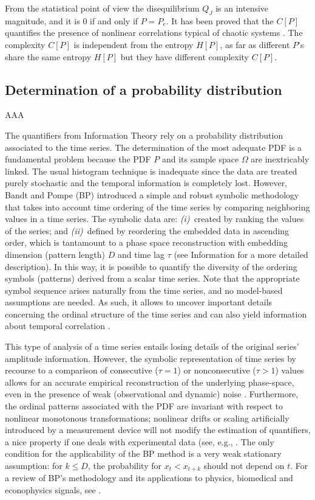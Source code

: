 From the statistical point of view the disequilibrium $Q_J$ is an intensive magnitude, and it is $0$ if and only if $P=P_e$.
It has been proved that the $C[P]$ quantifies the presence of nonlinear correlations typical of chaotic systems \cite{Martin2003,Lamberti2004}.
The complexity $C[P]$ is independent from the entropy $H[P]$, as far as different $P$'s share the same entropy $H[P]$ but they have different complexity $C[P]$.

\subsection{Determination of a probability distribution}

AAA

The quantifiers from Information Theory rely on a probability distribution associated to the time series. 
The determination of the most adequate PDF is a fundamental problem because the PDF $P$ and its sample space 
$\Omega$ are inextricably linked. The usual histogram technique is inadequate since the data are treated purely stochastic and the temporal information is completely lost. 
However, Bandt and Pompe (BP)\cite{Bandt2002} introduced a simple and robust symbolic methodology that takes into account time ordering of the time series by comparing neighboring values in a time series.
The symbolic data are:
{\it (i)\/}~created by ranking the values of the series; and
{\it (ii)\/}~defined by reordering the embedded data in ascending order, which is tantamount to a phase space 
reconstruction with embedding dimension (pattern length) $D$ and time lag $\tau$ (see Information for a more detailed description). 
In this way, it is possible to quantify the diversity of the ordering symbols (patterns) derived from a scalar 
time series.
Note that the appropriate symbol sequence arises naturally from the time series, and no model-based assumptions 
are needed.
As such, it allows to uncover important details concerning the ordinal structure of the time series
\cite{Rosso2007} and can also yield information about temporal correlation \cite{Rosso2009}.

This type of analysis of a time series entails losing details of the original series' amplitude information. However, the symbolic representation of time series by recourse to a comparison of consecutive ($\tau = 1$) or nonconsecutive ($\tau > 1$) values allows for an accurate empirical reconstruction of the underlying phase-space, even in the presence of weak (observational and dynamic) noise \cite{Bandt2002}. Furthermore, the ordinal patterns associated with the PDF are invariant with respect to nonlinear monotonous transformations; nonlinear drifts or scaling artificially introduced by a measurement device will not modify the estimation of quantifiers, a nice property if one deals with experimental data (see, e.g., \cite{Saco2010}. 
The only condition for the applicability of the BP method is a very weak stationary assumption: for 
$k \leq D$, the probability for $x_t < x_{t+k}$ should not depend on $t$.
For a review of BP's methodology and its applications to physics, biomedical and econophysics signals, see \cite{Zanin2012}. 

